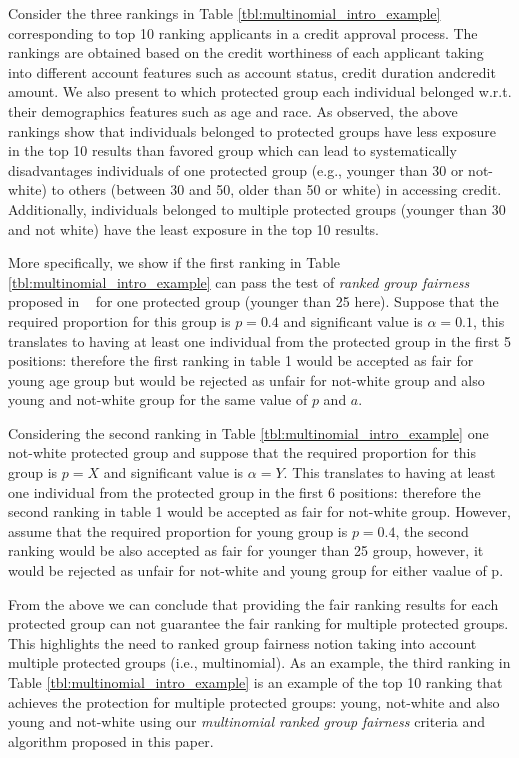 \begin{example} Consider the three rankings in Table \ref{tbl:multinomial_intro_example} corresponding to top 10 ranking applicants in a credit approval process. The rankings are obtained based on the credit worthiness of each applicant taking into different account features such as account status, credit duration andcredit amount. 
	We also present to which protected group each individual belonged w.r.t. their demographics features such as age and race. As observed, the above rankings show that 
	individuals belonged to protected groups have less exposure in the top 10 results than favored group which can lead to systematically disadvantages individuals of one protected group (e.g., younger than 30 or not-white) to others (between 30 and 50, older than 50 or white) in accessing credit. Additionally, individuals belonged to multiple protected groups (younger than 30 and not white) have the least exposure in the top 10 results.
	
	More specifically, we show if the first ranking in Table \ref{tbl:multinomial_intro_example} can pass the test of \textit{ranked group fairness} proposed in ~\cite{zehlike2017fair} for one protected group (younger than 25 here). Suppose that the required proportion for this group is $p = 0.4$ and significant value is $\alpha = 0.1$, this translates to having at least one individual from the protected group in the first 5 positions: therefore the first ranking in table 1 would be accepted as fair for young age group but would be rejected as unfair for not-white group and also young and not-white group for the same value of $p$ and $a$.
	
	Considering the second ranking in Table \ref{tbl:multinomial_intro_example} one not-white protected group and suppose that the required proportion for this group is $p = X$ and significant value is $\alpha = Y$. This translates to having at least one individual from the protected group in the first 6 positions: therefore the second ranking in table 1 would be accepted as fair for not-white group. However, assume that 
	the required proportion for young group is $p = 0.4$, the second ranking would be also accepted as fair for younger than 25 group, however, it would be rejected as unfair for not-white and young group for either vaalue of p.
	
	From the above we can conclude that providing the fair ranking results for each protected group can not guarantee the fair ranking for multiple protected groups. This highlights the need to ranked group fairness notion taking into account multiple protected groups (i.e., multinomial). As an example, the third ranking in Table \ref{tbl:multinomial_intro_example} is an example of the top 10 ranking that achieves the protection for multiple protected groups: young, not-white and also young and not-white using our \textit{multinomial ranked group fairness} criteria and algorithm proposed in this paper. 
	
\end{example}
\medskip

